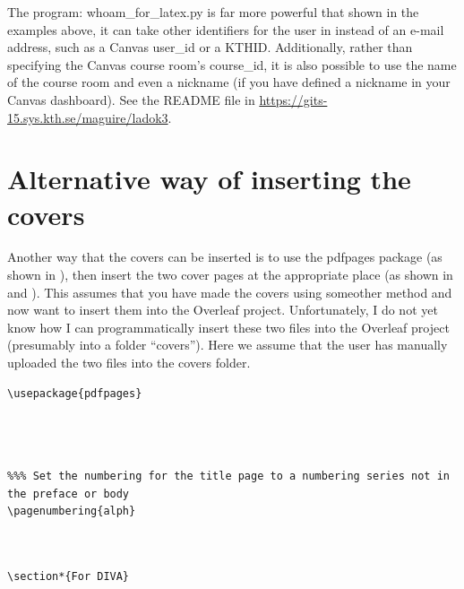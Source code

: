 The program: whoam\_for\_latex.py is far more powerful that shown in the examples above, it can take other identifiers for the user in instead of an e-mail address, such as a Canvas user\_id or a KTHID. Additionally, rather than specifying the Canvas course room’s course\_id, it is also possible to use the name of the course room and even a nickname (if you have defined a nickname in your Canvas dashboard). See the README file in \url{https://gits-15.sys.kth.se/maguire/ladok3}.


\section{Alternative way of inserting the covers}
Another way that the covers can be inserted is to use the pdfpages package (as shown in ), then insert the two cover pages at the appropriate place (as shown in  and ). This assumes that you have made the covers using someother method and now want to insert them into the Overleaf project. Unfortunately, I do not yet know how I can programmatically insert these two files into the Overleaf project (presumably into a folder “covers”). Here we assume that the user has manually uploaded the two files into the covers folder.
\begin{lstlisting}[language={[LaTeX]TeX}, caption={Insert this include file either in the main text document or the includes.tex file}, label=lst:includeAfterHyperref]
% To use KTH pdf covers
\usepackage{pdfpages}


\end{lstlisting} 	
\begin{lstlisting}[language={[LaTeX]TeX}, caption={Insert the front cover before the title page}, label=lst:frontCover]
% Add front cover


%%% Set the numbering for the title page to a numbering series not in the preface or body
\pagenumbering{alph}
\end{lstlisting}

\begin{lstlisting}[language={[LaTeX]TeX}, caption={Insert the back cover page before the For DiVA section}, label=lst:backCover]
% Add back cover, unsure if this is supposed to be before or after the "For DiVA" pages


\section*{For DIVA}
\end{lstlisting}

